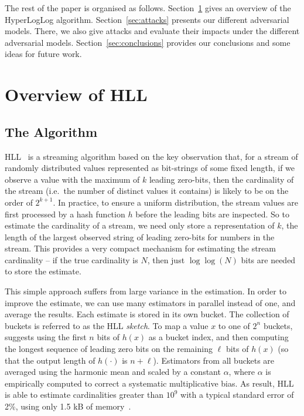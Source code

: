 \documentclass{IEEEtran}
\begin{document}
The rest of the paper is organised as follows. Section~\ref{sec:overview} gives an overview of the HyperLogLog algorithm. Section~\ref{sec:attacks} presents our different adversarial models. There, we also give attacks and evaluate their impacts under the different adversarial models. Section~\ref{sec:conclusions} provides our conclusions and some ideas for future work.



\section{Overview of HLL}\label{sec:overview}
\subsection{The Algorithm}
HLL~\cite{hll} is a streaming algorithm based on the key observation that, for a stream of randomly distributed values represented as bit-strings of some fixed length, if we observe a value with the maximum of $k$ leading zero-bits, then the cardinality of the stream (i.e.\ the number of distinct values it contains) is likely to be on the order of $2^{k+1}$. In practice, to ensure a uniform distribution, the stream values are first processed by a hash function $h$ before the leading bits are inspected. So to estimate the cardinality of a stream, we need only store a representation of $k$, the length of the largest observed string of leading zero-bits for numbers in the stream. This provides a very compact mechanism for estimating the stream cardinality -- if the true cardinality is $N$, then just $\log\log(N)$ bits are needed to store the estimate.

This simple approach suffers from large variance in the estimation. In order to improve the estimate, we can use many estimators in parallel instead of one, and average the results. Each estimate is stored in its own bucket. The collection of buckets is referred to as the HLL \emph{sketch}. To map a value $x$ to one of $2^n$ buckets, \cite{loglog} suggests using the first $n$ bits of $h(x)$ as a bucket index, and then computing the longest sequence of leading zero bits on the remaining $\ell$ bits of $h(x)$ (so that the output length of $h(\cdot)$ is $n+\ell$). Estimators from all buckets are averaged using the harmonic mean and scaled by a constant $\alpha$, where $\alpha$ is empirically computed to correct a systematic multiplicative bias. As result, HLL is able to estimate cardinalities greater than $10^9$ with a typical standard error of 2\%, using only 1.5 kB of memory~\cite{hll}.
\end{document}
